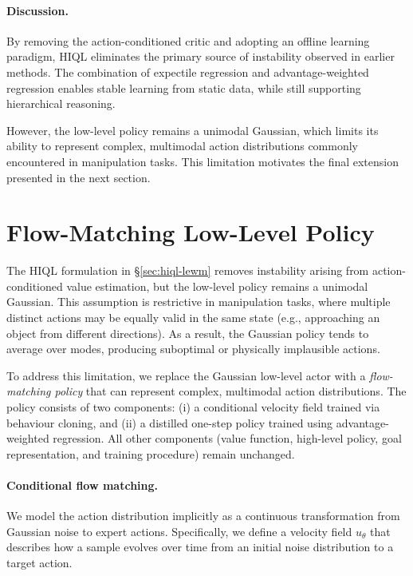 \paragraph{Discussion.}
By removing the action-conditioned critic and adopting an offline
learning paradigm, HIQL eliminates the primary source of instability
observed in earlier methods. The combination of expectile regression and
advantage-weighted regression enables stable learning from static data,
while still supporting hierarchical reasoning.

However, the low-level policy remains a unimodal Gaussian, which limits
its ability to represent complex, multimodal action distributions
commonly encountered in manipulation tasks. This limitation motivates the
final extension presented in the next section.

\section{Flow-Matching Low-Level Policy}
\label{sec:hiql-flow}

The HIQL formulation in \S\ref{sec:hiql-lewm} removes instability arising
from action-conditioned value estimation, but the low-level policy
remains a unimodal Gaussian. This assumption is restrictive in
manipulation tasks, where multiple distinct actions may be equally valid
in the same state (e.g., approaching an object from different
directions). As a result, the Gaussian policy tends to average over
modes, producing suboptimal or physically implausible actions.

To address this limitation, we replace the Gaussian low-level actor with
a \emph{flow-matching policy} that can represent complex, multimodal
action distributions. The policy consists of two components: (i) a
conditional velocity field trained via behaviour cloning, and (ii) a
distilled one-step policy trained using advantage-weighted regression.
All other components (value function, high-level policy, goal
representation, and training procedure) remain unchanged.

\paragraph{Conditional flow matching.}
We model the action distribution implicitly as a continuous
transformation from Gaussian noise to expert actions. Specifically, we
define a velocity field $u_\theta$ that describes how a sample evolves
over time from an initial noise distribution to a target action.

